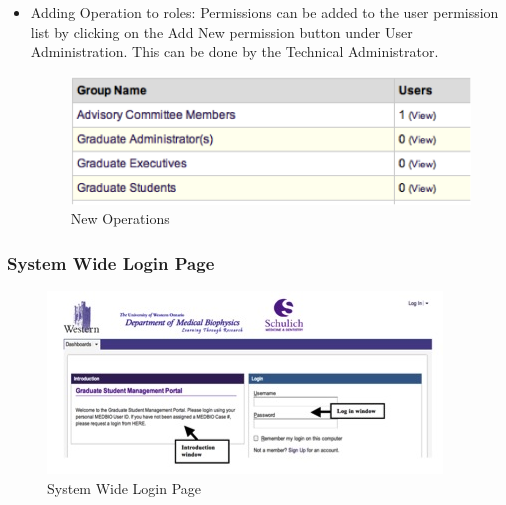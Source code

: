 \documentclass{journal}
\begin{document}
\begin{itemize}
\begin{itemize}
\item Adding Operation to roles: Permissions can be added to the user permission list by clicking on the Add New permission button under User Administration. This can be done by the Technical Administrator.

\begin{figure}[htp]
\centering
\includegraphics[scale=1]{diagrams/HTMLTemplating/Figure9.png}
\caption{New Operations}
\label{fig:NewPermission}
\end{figure}


\end{itemize}
\end{itemize}

\subsubsection{System Wide Login Page}

\begin{figure}[htp]
\centering
\includegraphics[scale=1]{diagrams/HTMLTemplating/Figure1.jpg}
\caption{System Wide Login Page}
\label{fig:SystemWideLogin}
\end{figure}
\end{document}
